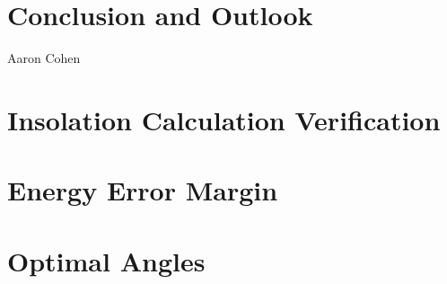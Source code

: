 \documentclass[%
    draft, %
    11pt,
    a4paper
]
{memoir}
\begin{document}
%
%


\chapter{Conclusion and Outlook}
  {Aaron Cohen} %
\label{sec:ConclusionAndOutlook}



\pagestyle{ruled}


\begin{small}
\raggedright
%

\end{small}
\cleardoublepage




\pagestyle{ruled}

\begin{appendix}

\end{appendix}

\chapter{Insolation Calculation Verification}
\label{sec:Appendix:InsolationCalculationVerification}


\chapter{Energy Error Margin}
\label{sec:Appendix:EnergyErrorMargin}


\chapter{Optimal Angles}
\label{sec:Appendix:OptimalAngles}



\end{document}
